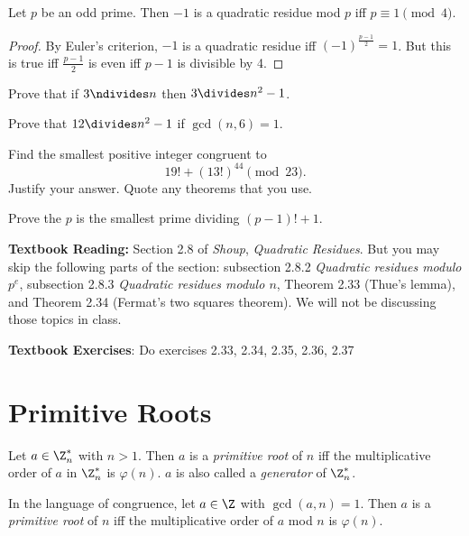 \documentclass[oneside,12pt]{amsart}
\begin{document}
\begin{theorem}
Let $p$ be an odd prime. Then $-1$ is a quadratic residue mod $p$ iff $p\equiv 1 \pmod 4$.
\end{theorem}
\begin{proof}
By Euler's criterion, $-1$ is a quadratic residue iff $(-1)^{\frac{p-1}{2}}=1$. But this is true
iff $\frac{p-1}{2}$ is even iff $p-1$ is divisible by 4.
\end{proof}

\bigskip

\begin{homework} 
Prove that if $3\ndivides n$ then $3\divides n^2 -1$.
\end{homework}

\begin{homework}
Prove that $12 \divides n^2 -1$ if $\gcd(n,6) = 1$.
\end{homework}

\begin{homework}
Find the smallest positive integer congruent to
$$19! + (13!)^{44} \pmod{23}.$$
Justify your answer. Quote any theorems that you use.
\end{homework}

\begin{homework}
Prove the $p$ is the smallest prime dividing $(p-1)! + 1$.
\end{homework}

\bigskip

\textbf{Textbook Reading:} Section 2.8 of \emph{Shoup}, \emph{Quadratic Residues}. But you may skip the following parts of the section:
subsection 2.8.2 \emph{Quadratic residues modulo $p^e$}, subsection 2.8.3 \emph{Quadratic residues modulo $n$}, Theorem 2.33 (Thue's lemma),
and Theorem 2.34 (Fermat's two squares theorem). We will not be discussing those topics in class.

\textbf{Textbook Exercises}: Do exercises 2.33, 2.34, 2.35, 2.36, 2.37

\newpage

\section{Primitive Roots}

\begin{definition}
Let $a\in\Z_n^*$ with $n>1$. Then $a$ is a \emph{primitive root} of $n$ iff the multiplicative order of $a$ in $\Z^*_n$ is $\varphi(n)$.
$a$ is also called a \emph{generator} of $\Z^*_n$.

In the language of congruence, let $a\in\Z$ with $\gcd(a,n)=1$. Then $a$ is a \emph{primitive root} of $n$ iff the multiplicative order of
$a$ mod $n$ is $\varphi(n)$.
\end{definition}
\end{document}
